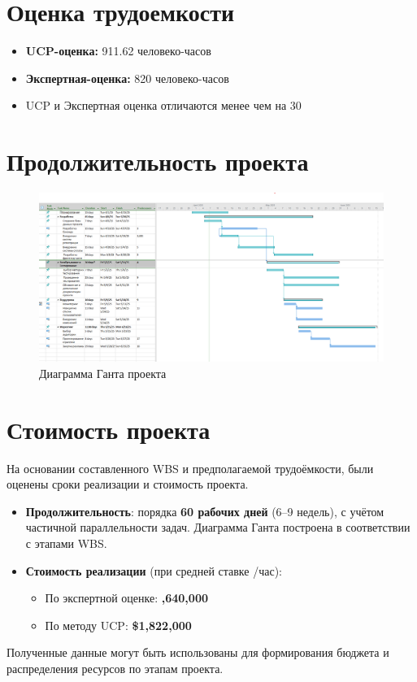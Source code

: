 \documentclass[14pt, russian]{matmex-diploma-custom}
\begin{document}
\section{Оценка трудоемкости}
\begin{itemize}
    \item \textbf{UCP-оценка:} 911.62 человеко-часов
    \item \textbf{Экспертная-оценка:} 820 человеко-часов
    \item UCP и Экспертная оценка отличаются менее чем на 30
\end{itemize}

\section{Продолжительность проекта}
\begin{figure}[h!]
    \centering
    \includegraphics[width=\textwidth]{gant.png}
    \caption{Диаграмма Ганта проекта}
    \label{fig:gantt}
  \end{figure}

\section{Стоимость проекта}
На основании составленного WBS и предполагаемой трудоёмкости, были оценены сроки реализации и стоимость проекта.

\begin{itemize}
    \item \textbf{Продолжительность}: порядка \textbf{60 рабочих дней} (6–9 недель), с учётом частичной параллельности задач. Диаграмма Ганта построена в соответствии с этапами WBS.
    \item \textbf{Стоимость реализации} (при средней ставке /час):
    \begin{itemize}
        \item По экспертной оценке: \textbf{,640,000}
        \item По методу UCP: \textbf{\$1,822,000}
    \end{itemize}
\end{itemize}

Полученные данные могут быть использованы для формирования бюджета и распределения ресурсов по этапам проекта.
\end{document}
